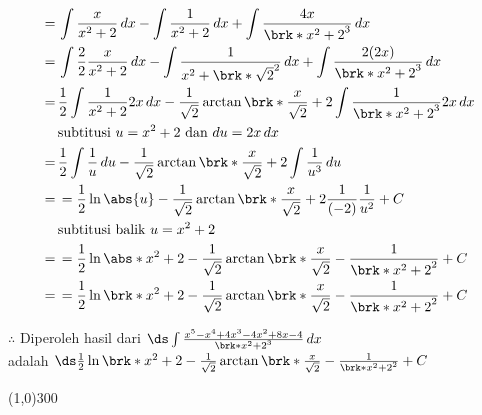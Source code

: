 \begin{enumerate}[leftmargin=*, label={\arabic*}.]
\begin{enumerate}[label={\alph*}.]
\begin{align*}
        =\,&\int \frac{x}{x^{2}+2}\,dx - \int \frac{1}{x^{2}+2}\,dx 
        + \int \frac{4x}{\brk*{x^{2}+2}^{3}}\,dx\\
        =\,&\int \frac{2}{2}\frac{x}{x^{2}+2}\,dx - \int \frac{1}{x^{2}+\brk*{\sqrt{2}}^{2}}\,dx 
        + \int \frac{2(2x)}{\brk*{x^{2}+2}^{3}}\,dx\\
        =\,&\frac{1}{2}\int \frac{1}{x^{2}+2}2x\,dx 
        - \frac{1}{\sqrt{2}}\arctan\brk*{\frac{x}{\sqrt{2}}} 
        + 2\int \frac{1}{\brk*{x^{2}+2}^{3}}2x\,dx\\
        &\text{subtitusi $u=x^{2}+2$ dan $du = 2x\,dx$}\\
        =\,&\frac{1}{2}\int\frac{1}{u}\,du
        -\frac{1}{\sqrt{2}}\arctan\brk*{\frac{x}{\sqrt{2}}} 
        +2\int \frac{1}{u^{3}}\,du\\
        =\,&=\frac{1}{2}\ln\abs{u}-\frac{1}{\sqrt{2}}\arctan\brk*{\frac{x}{\sqrt{2}}} 
        +2\frac{1}{(-2)}\frac{1}{u^{2}}+C\\
        &\text{subtitusi balik $u=x^{2}+2$}\\
        =\,&=\frac{1}{2}\ln\abs*{x^{2}+2}-\frac{1}{\sqrt{2}}\arctan\brk*{\frac{x}{\sqrt{2}}} 
        -\frac{1}{\brk*{x^{2}+2}^{2}}+C\\
        =\,&=\frac{1}{2}\ln\brk*{x^{2}+2}-\frac{1}{\sqrt{2}}\arctan\brk*{\frac{x}{\sqrt{2}}} 
        -\frac{1}{\brk*{x^{2}+2}^{2}}+C
    \end{align*}

    $\therefore$ Diperoleh hasil dari $\ds \int \frac{x^{5}-x^{4}+4x^{3}-4x^{2}+8x-4}{\brk*{x^{2}+2}^{3}}\,dx$\\
    adalah $\ds \frac{1}{2}\ln\brk*{x^{2}+2}-\frac{1}{\sqrt{2}}\arctan\brk*{\frac{x}{\sqrt{2}}} 
    -\frac{1}{\brk*{x^{2}+2}^{2}}+C$
\end{enumerate}
\end{enumerate}

\begin{center}
    \line(1,0){300}
\end{center}